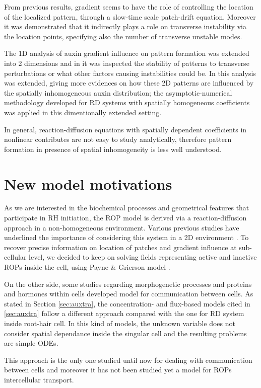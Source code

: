 From previous results, gradient seems to have the role of controlling the location of the localized pattern, through a slow-time scale patch-drift equation. Moreover it was demonstrated that it indirectly plays a role on transverse instability via the location points, specifying also the number of transverse unstable modes.

The 1D analysis of auxin gradient influence on pattern formation was extended into 2 dimensions and in \cite{intra2} it was inspected the stability of patterns to transverse perturbations or what other factors causing instabilities could be. In \cite{intra1_R} this analysis was extended, giving more evidences on how these 2D patterns are influenced by the spatially inhomogeneous auxin distribution; the asymptotic-numerical methodology developed for RD systems with spatially homogeneous coefficients was applied in this dimentionally extended setting.

In general, reaction-diffusion equations with spatially dependent coefficients in nonlinear contributes are not easy to study analytically, therefore pattern formation in presence of spatial inhomogeneity is less well understood.

\section{New model motivations}
As we are interested in the biochemical processes and geometrical features that participate in RH initiation, the ROP model is derived via a reaction-diffusion approach in a non-homogeneous environment. Various previous studies have underlined the importance of considering this system in a 2D environment \cite{phdthesis:victor, intra2, intra1_R}. To recover precise information on location of patches and gradient influence at sub-cellular level, we decided to keep on solving fields representing active and inactive ROPs inside the cell, using Payne \& Grierson model \cite{payne}.

On the other side, some studies regarding morphogenetic processes and proteins and hormones within cells  developed model for communication between cells. As stated in Section \ref{sec:auxtra}, the concentration- and flux-based models cited in \ref{sec:auxtra} follow a different approach compared with the one for RD system inside root-hair cell. In this kind of models, the unknown variable does not consider spatial dependance inside the singular cell and the resulting problems are simple ODEs.

This approach is the only one studied until now for dealing with communication between cells and moreover it has not been studied yet a model for ROPs intercellular transport.


